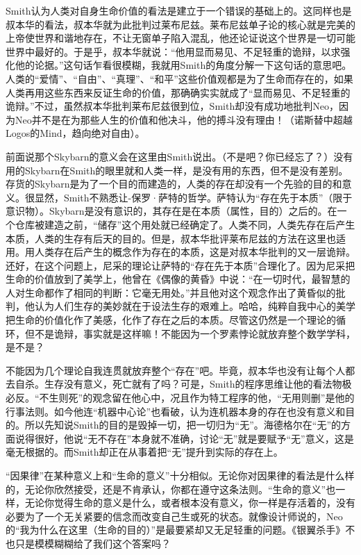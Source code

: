 \documentclass[UTF8]{ctexart}
\begin{document}
Smith认为人类对自身生命价值的看法是建立于一个错误的基础上的。这同样也是叔本华的看法，叔本华就为此批判过莱布尼兹。莱布尼兹单子论的核心就是完美的上帝使世界和谐地存在，不让无窗单子陷入混乱，他还论证说这个世界是一切可能世界中最好的。于是乎，叔本华就说：“他用显而易见、不足轻重的诡辩，以求强化他的论据。”这句话乍看很模糊，我就用Smith的角度分解一下这句话的意思吧。人类的“爱情”、“自由”、“真理”、“和平”这些价值观都是为了生命而存在的，如果人类再用这些东西来反证生命的价值，那确确实实就成了“显而易见、不足轻重的诡辩。”不过，虽然叔本华批判莱布尼兹很到位，Smith却没有成功地批判Neo，因为Neo并不是在为那些人生的价值和他决斗，他的搏斗没有理由！（诺斯替中超越Logos的Mind，趋向绝对自由）。

前面说那个Skybarn的意义会在这里由Smith说出。（不是吧？你已经忘了？）没有用的Skybarn在Smith的眼里就和人类一样，是没有用的东西，但不是没有差别。存货的Skybarn是为了一个目的而建造的，人类的存在却没有一个先验的目的和意义。很显然，Smith不熟悉让-保罗·萨特的哲学。萨特认为“存在先于本质”（限于意识物）。Skybarn是没有意识的，其存在是在本质（属性，目的）之后的。在一个仓库被建造之前，“储存”这个用处就已经确定了。人类不同，人类先存在后产生本质，人类的生存有后天的目的。但是，叔本华批评莱布尼兹的方法在这里也适用。用人类存在后产生的概念作为存在的本质，这是对叔本华批判的又一层诡辩。还好，在这个问题上，尼采的理论让萨特的“存在先于本质”合理化了。因为尼采把生命的价值放到了美学上，他曾在《偶像的黄昏》中说：“在一切时代，最智慧的人对生命都作了相同的判断：它毫无用处。”并且他对这个观念作出了黄昏似的批判，他认为人们生存的美妙就在于设法生存的艰难上。哈哈，纯粹自我中心的美学把生命的价值化作了美感，化作了存在之后的本质。尽管这仍然是一个理论的循环，但不是诡辩，事实就是这样嘛！不能因为一个罗素悖论就放弃整个数学学科，是不是？

不能因为几个理论自我连贯就放弃整个“存在”吧。毕竟，叔本华也没有让每个人都去自杀。生存没有意义，死亡就有了吗？可是，Smith的程序思维让他的看法物极必反。“不生则死”的观念留在他心中，况且作为特工程序的他，“无用则删”是他的行事法则。如今他连“机器中心论”也看破，认为连机器本身的存在也没有意义和目的。所以先知说Smith的目的是毁掉一切，把一切归为“无”。海德格尔在“无”的方面说得很好，他说“无不存在”本身就不准确，讨论“无”就是要赋予“无”意义，这是毫无根据的。而Smith却正在从事着把“无”提升到实际的存在上。

“因果律”在某种意义上和“生命的意义”十分相似。无论你对因果律的看法是什么样的，无论你欣然接受，还是不肯承认，你都在遵守这条法则。“生命的意义”也一样，无论你觉得生命的意义是什么，或者根本没有意义，你一样是存活着的，没有必要为了一个无关紧要的信念而改变自己生或死的状态。就像设计师说的，Neo的“我为什么在这里（生命的目的）”是最要紧却又无足轻重的问题。《银翼杀手》不也只是模模糊糊给了我们这个答案吗？
\end{document}
